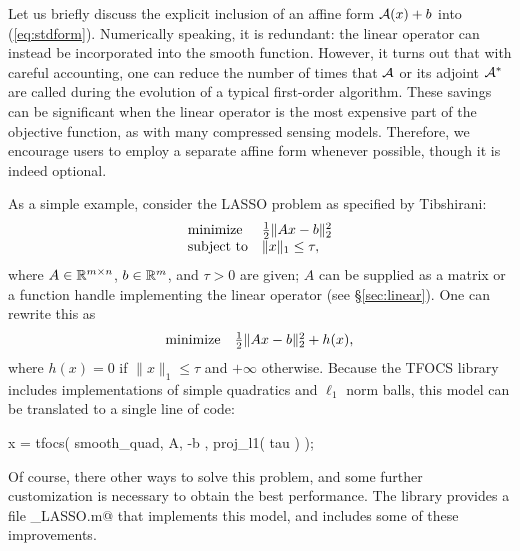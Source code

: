 \documentclass{article}
\begin{document}
Let us briefly discuss the explicit inclusion of an affine
form $\mathcal{A}(x)+b$ into (\ref{eq:stdform}). Numerically speaking, it
is redundant: the linear operator can instead be incorporated into the
smooth function. However, it turns out that
with careful accounting, one can reduce the number of times that
$\mathcal{A}$ or its adjoint $\mathcal{A}^*$ are called during the evolution of a typical
first-order algorithm. These savings can be significant when
the linear operator is the most expensive part of the objective function,
as with many compressed sensing models. Therefore, we
encourage users to employ a separate affine form whenever possible,
though it is indeed optional.

As a simple example, consider the LASSO problem as specified by Tibshirani:
\begin{equation}
	\begin{array}{ll}
		\text{minimize}   & {\textstyle\frac{1}{2}}\|Ax-b\|_2^2 \\
		\text{subject to} & \|x\|_1 \leq \tau, 
	\end{array}
\end{equation}
where $A\in\mathbb{R}^{m\times n}$, $b\in\mathbb{R}^m$, and $\tau>0$ are given; $A$
can be supplied as a matrix or a function handle implementing the
linear operator (see \S\ref{sec:linear}). One can rewrite this as
\[
	\begin{array}{ll}
		\text{minimize}   & {\textstyle\frac{1}{2}}\|Ax-b\|_2^2 + h(x),\\
	\end{array}
\]
where $h(x) = 0$ if $\|x\|_1 \le \tau$ and $+\infty$
otherwise. Because the TFOCS library includes implementations of
simple quadratics and $\ell_1$ norm balls, this model can be
translated to a single line of code:
\begin{code}
	x = tfocs( smooth_quad, { A, -b }, proj_l1( tau )  );
\end{code}
Of course, there other ways to solve this problem, and some further
customization is necessary to obtain the best performance. The
library provides a file \verb@solver_LASSO.m@ that implements
this model, and includes some of these improvements.
\end{document}
